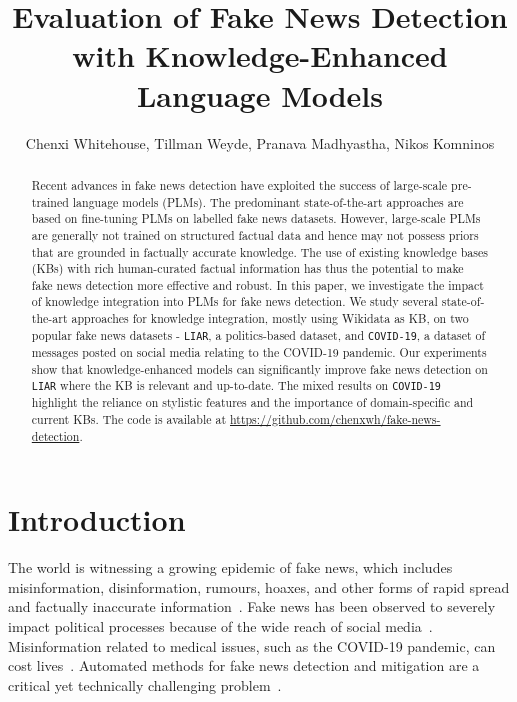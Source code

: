 \documentclass[letterpaper]{article} %
\title{Evaluation of Fake News Detection with Knowledge-Enhanced Language Models}
\author{
Chenxi Whitehouse, Tillman Weyde, Pranava Madhyastha, Nikos Komninos
}
\begin{document}
\maketitle


\begin{abstract}

Recent advances in fake news detection have exploited the success of large-scale pre-trained language models (PLMs).
The predominant state-of-the-art approaches are based on fine-tuning PLMs on labelled fake news datasets. 
However, large-scale PLMs are generally not trained on structured factual data and hence may not possess priors that are grounded in factually accurate knowledge. 
The use of existing knowledge bases (KBs) with rich human-curated factual information has thus the potential to make fake news detection more effective and robust.  
In this paper, we investigate the impact of knowledge integration into PLMs for fake news detection. 
We study several state-of-the-art approaches for knowledge integration, mostly using Wikidata as KB, on two popular fake news datasets - \texttt{LIAR}, a politics-based dataset, and \texttt{COVID-19}, a dataset of messages posted on social media relating to the COVID-19 pandemic. 
Our experiments show that knowledge-enhanced models can significantly improve fake news detection on \texttt{LIAR} where the KB is relevant and up-to-date.
The mixed results on \texttt{COVID-19} highlight the reliance on stylistic features and the importance of domain-specific and current KBs. 
The code is available at \url{https://github.com/chenxwh/fake-news-detection}.


\end{abstract}

\section{Introduction}
The world is witnessing a growing epidemic of fake news, which includes misinformation, disinformation, rumours, hoaxes, and other forms of rapid spread and factually inaccurate information~\cite{Sharma2019CombatingFN}. 
Fake news has been observed to severely impact political processes because of the wide reach of social media~\cite{2016-Election}. 
Misinformation related to medical issues, such as the COVID-19 pandemic, can cost lives~\cite{OConnor2020GoingVD}.
Automated methods for fake news detection and mitigation are a critical yet technically challenging problem~\cite{thorne-vlachos-2018-automated}. 
\end{document}
